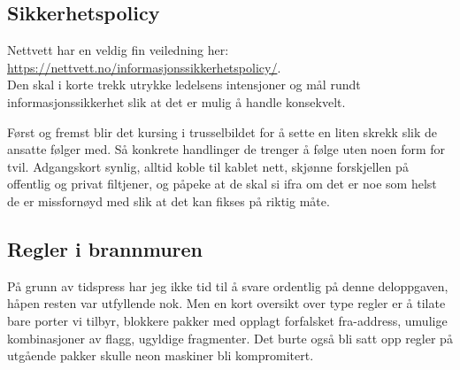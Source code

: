 \documentclass[12pt,a4paper,norsk]{article}
\begin{document}
\subsection*{Sikkerhetspolicy}
Nettvett har en veldig fin veiledning her: \\ \url{https://nettvett.no/informasjonssikkerhetspolicy/}. \\Den skal i korte trekk utrykke ledelsens intensjoner og mål rundt informasjonssikkerhet slik at det er mulig å handle konsekvelt.

Først og fremst blir det kursing i trusselbildet for å sette en liten skrekk slik de ansatte følger med. Så konkrete handlinger de trenger å følge uten noen form for tvil. Adgangskort synlig, alltid koble til kablet nett, skjønne forskjellen på offentlig og privat filtjener, og påpeke at de skal si ifra om det er noe som helst de er missfornøyd med slik at det kan fikses på riktig måte.

\subsection*{Regler i brannmuren}
På grunn av tidspress har jeg ikke tid til å svare ordentlig på denne deloppgaven, håpen resten var utfyllende nok. Men en kort oversikt over type regler er å tilate bare porter vi tilbyr, blokkere pakker med opplagt forfalsket fra-address, umulige kombinasjoner av flagg, ugyldige fragmenter. Det burte også bli satt opp regler på utgående pakker skulle neon maskiner bli kompromitert.
\end{document}
